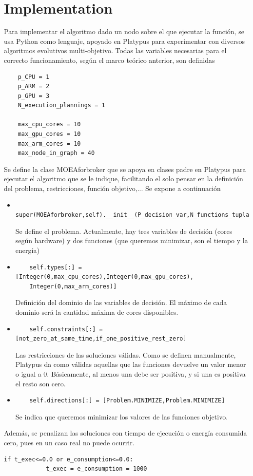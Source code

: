 \documentclass{article}
\begin{document}
	\section{Implementation}

Para implementar el algoritmo dado un nodo sobre el que ejecutar la función, se usa Python como lenguaje, apoyado en Platypus para experimentar con diversos algoritmos evolutivos multi-objetivo. Todas las variables necesarias para el correcto funcionamiento, según el marco teórico anterior, son definidas

\begin{verbatim}
	p_CPU = 1
	p_ARM = 2
	p_GPU = 3
	N_execution_plannings = 1 

	max_cpu_cores = 10
	max_gpu_cores = 10
	max_arm_cores = 10
	max_node_in_graph = 40
\end{verbatim}

Se define la clase MOEAforbroker que se apoya en clases padre en Platypus para ejecutar el algoritmo que se le indique, facilitando el solo pensar en la definición del problema, restricciones, función objetivo,... Se expone a continuación

\begin{itemize}
	\item \begin{verbatim} super(MOEAforbroker,self).__init__(P_decision_var,N_functions_tuplas)

	\end{verbatim} Se define el problema. Actualmente, hay tres variables de decisión (cores según hardware) y dos funciones (que queremos minimizar, son el tiempo y la energía)
	\item \begin{verbatim}
	self.types[:] = [Integer(0,max_cpu_cores),Integer(0,max_gpu_cores),
	Integer(0,max_arm_cores)] 
	\end{verbatim} Definición del dominio de las variables de decisión. El máximo de cada dominio será la cantidad máxima de cores disponibles.
	\item \begin{verbatim}
	self.constraints[:] = [not_zero_at_same_time,if_one_positive_rest_zero]
	\end{verbatim}Las restricciones de las soluciones válidas. Como se definen manualmente, Platypus da como válidas aquellas que las funciones devuelve un valor menor o igual a 0. Básicamente, al menos una debe ser positiva, y si una es positiva el resto son cero.
	\item \begin{verbatim}
	self.directions[:] = [Problem.MINIMIZE,Problem.MINIMIZE]
	\end{verbatim} Se indica que queremos minimizar los valores de las funciones objetivo.
\end{itemize}
Además, se penalizan las soluciones con tiempo de ejecución o energía consumida cero, pues en un caso real no puede ocurrir.
\begin{verbatim}
if t_exec<=0.0 or e_consumption<=0.0:   
            t_exec = e_consumption = 1000
\end{verbatim}
\end{document}

